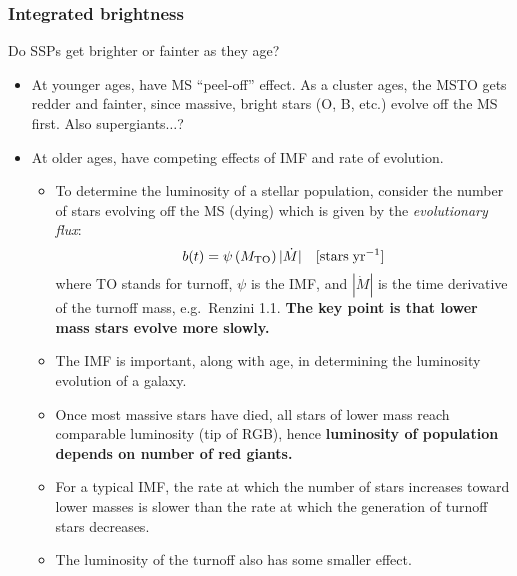 \documentclass{article}
\newcommand{\mynotes}[1]{\textcolor{cadmiumgreen}{#1}}
\begin{document}
\subsubsection{Integrated brightness}
Do SSPs get brighter or fainter as they age?
\begin{itemize}
    \item At younger ages, have MS ``peel-off'' effect.
        \mynotes{As a cluster ages, the MSTO gets redder and fainter,
        since massive, bright stars (O, B, etc.) evolve off the MS first.}
        Also supergiants\mynotes{$\ldots$?}
    \item At older ages, have competing effects of IMF and rate of
        evolution.
        \begin{itemize}
            \item To determine the luminosity of a stellar population, consider
                the number of stars evolving off the MS (dying)
                which is given by the \textit{evolutionary flux}:
                \[
                    b(t) = \psi\left(M_{\textrm{TO}}\right)
                    |\dot{M}|\quad[\textrm{stars\;yr}^{-1}]
                    \]
                where TO stands for turnoff, $\psi$ is the IMF, and $|\dot{M}|$
                is the time derivative of the turnoff mass, e.g.\ Renzini 1.1.
                \textbf{The key point is that lower mass stars evolve more slowly.}
            \item The IMF is important, along with age, in
                determining the luminosity evolution of a galaxy.
            \item Once most massive stars have died,
                all stars of lower mass reach comparable luminosity (tip of
                RGB), hence \textbf{luminosity of population depends on number
                of red giants.}
            \item For a typical IMF, the rate at which the number of stars
                increases toward lower masses is slower than the rate at which
                the generation of turnoff stars decreases.
            \item The luminosity of the turnoff also has some smaller effect.
        \end{itemize}
\end{itemize}
\end{document}
